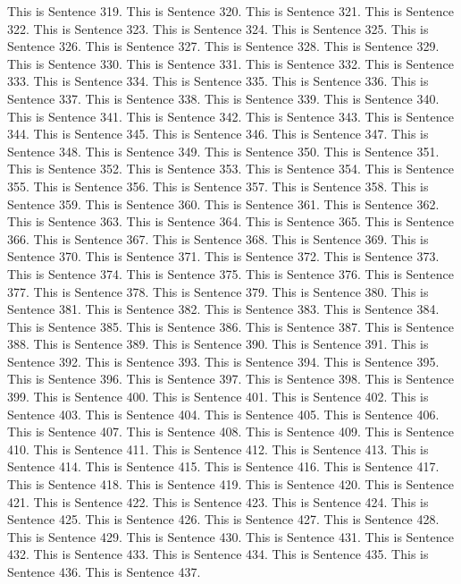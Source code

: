 \documentclass{article}
\begin{document}
This is Sentence 319.
This is Sentence 320.
This is Sentence 321.
This is Sentence 322.
This is Sentence 323.
This is Sentence 324.
This is Sentence 325.
This is Sentence 326.
This is Sentence 327.
This is Sentence 328.
This is Sentence 329.
This is Sentence 330.
This is Sentence 331.
This is Sentence 332.
This is Sentence 333.
This is Sentence 334.
This is Sentence 335.
This is Sentence 336.
This is Sentence 337.
This is Sentence 338.
This is Sentence 339.
This is Sentence 340.
This is Sentence 341.
This is Sentence 342.
This is Sentence 343.
This is Sentence 344.
This is Sentence 345.
This is Sentence 346.
This is Sentence 347.
This is Sentence 348.
This is Sentence 349.
This is Sentence 350.
This is Sentence 351.
This is Sentence 352.
This is Sentence 353.
This is Sentence 354.
This is Sentence 355.
This is Sentence 356.
This is Sentence 357.
This is Sentence 358.
This is Sentence 359.
This is Sentence 360.
This is Sentence 361.
This is Sentence 362.
This is Sentence 363.
This is Sentence 364.
This is Sentence 365.
This is Sentence 366.
This is Sentence 367.
This is Sentence 368.
This is Sentence 369.
This is Sentence 370.
This is Sentence 371.
This is Sentence 372.
This is Sentence 373.
This is Sentence 374.
This is Sentence 375.
This is Sentence 376.
This is Sentence 377.
This is Sentence 378.
This is Sentence 379.
This is Sentence 380.
This is Sentence 381.
This is Sentence 382.
This is Sentence 383.
This is Sentence 384.
This is Sentence 385.
This is Sentence 386.
This is Sentence 387.
This is Sentence 388.
This is Sentence 389.
This is Sentence 390.
This is Sentence 391.
This is Sentence 392.
This is Sentence 393.
This is Sentence 394.
This is Sentence 395.
This is Sentence 396.
This is Sentence 397.
This is Sentence 398.
This is Sentence 399.
This is Sentence 400.
This is Sentence 401.
This is Sentence 402.
This is Sentence 403.
This is Sentence 404.
This is Sentence 405.
This is Sentence 406.
This is Sentence 407.
This is Sentence 408.
This is Sentence 409.
This is Sentence 410.
This is Sentence 411.
This is Sentence 412.
This is Sentence 413.
This is Sentence 414.
This is Sentence 415.
This is Sentence 416.
This is Sentence 417.
This is Sentence 418.
This is Sentence 419.
This is Sentence 420.
This is Sentence 421.
This is Sentence 422.
This is Sentence 423.
This is Sentence 424.
This is Sentence 425.
This is Sentence 426.
This is Sentence 427.
This is Sentence 428.
This is Sentence 429.
This is Sentence 430.
This is Sentence 431.
This is Sentence 432.
This is Sentence 433.
This is Sentence 434.
This is Sentence 435.
This is Sentence 436.
This is Sentence 437.
\end{document}
